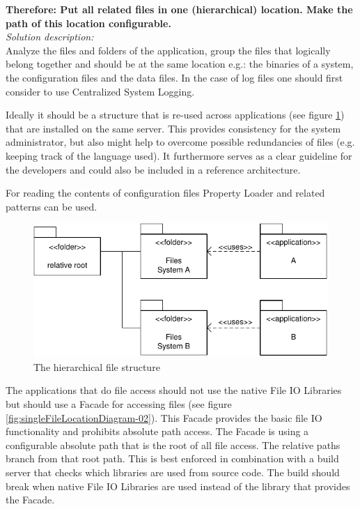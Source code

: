 \textbf{Therefore: Put all related files in one (hierarchical) location. Make the path of this location configurable.}\\

\textit{Solution description:}\\
Analyze the files and folders of the application, group the files that logically belong together and should be at the same location e.g.: the binaries of a system, the configuration files and the data files. In the case of log files one should first consider to use {\sc Centralized System Logging}.

Ideally it should be a structure that is re-used across applications (see figure \ref{fig:singleFileLocationDiagram-01}) that are installed on the same server. This provides consistency for the system administrator, but also might help to overcome possible redundancies of files (e.g. keeping track of the language used). It furthermore serves as a clear guideline for the developers and could also be included in a reference architecture.

For reading the contents of configuration files {\sc Property Loader} and related patterns \cite{Wellhausen2010} can be used. 

\begin{figure}[h]
\centering
\includegraphics{patterns/singleFileLocationDiagram-01.pdf}
\caption{The hierarchical file structure}
\label{fig:singleFileLocationDiagram-01}
\end{figure}

The applications that do file access should not use the native File IO Libraries but should use a {\sc Facade} \cite{Gamma95} for accessing files (see figure \ref{fig:singleFileLocationDiagram-02}). This {\sc Facade} provides the basic file IO functionality and prohibits absolute path access. The {\sc Facade} is using a configurable absolute path that is the root of all file access. The relative paths branch from that root path.  This is best enforced in combination with a build server that checks which libraries are used from source code. The build should break when native File IO Libraries are used instead of the library that provides the {\sc Facade}. 


